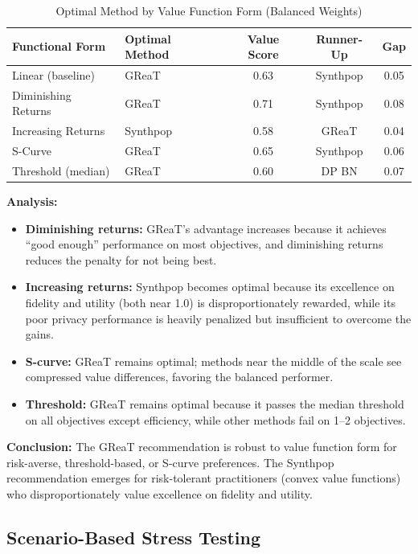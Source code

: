 \documentclass[12pt,a4paper]{article}
\begin{document}
\begin{table}[htbp]
\centering
\caption{Optimal Method by Value Function Form (Balanced Weights)}
\label{tab:value_function_sensitivity}
\begin{tabular}{@{}llccc@{}}
\toprule
\textbf{Functional Form} & \textbf{Optimal Method} & \textbf{Value Score} & \textbf{Runner-Up} & \textbf{Gap} \\
\midrule
Linear (baseline) & GReaT & 0.63 & Synthpop & 0.05 \\
Diminishing Returns & GReaT & 0.71 & Synthpop & 0.08 \\
Increasing Returns & Synthpop & 0.58 & GReaT & 0.04 \\
S-Curve & GReaT & 0.65 & Synthpop & 0.06 \\
Threshold (median) & GReaT & 0.60 & DP BN & 0.07 \\
\bottomrule
\end{tabular}
\end{table}

\textbf{Analysis:}
\begin{itemize}
    \item \textbf{Diminishing returns:} GReaT's advantage increases because it achieves ``good enough'' performance on most objectives, and diminishing returns reduces the penalty for not being best.
    \item \textbf{Increasing returns:} Synthpop becomes optimal because its excellence on fidelity and utility (both near 1.0) is disproportionately rewarded, while its poor privacy performance is heavily penalized but insufficient to overcome the gains.
    \item \textbf{S-curve:} GReaT remains optimal; methods near the middle of the scale see compressed value differences, favoring the balanced performer.
    \item \textbf{Threshold:} GReaT remains optimal because it passes the median threshold on all objectives except efficiency, while other methods fail on 1--2 objectives.
\end{itemize}

\textbf{Conclusion:} The GReaT recommendation is robust to value function form for risk-averse, threshold-based, or S-curve preferences. The Synthpop recommendation emerges for risk-tolerant practitioners (convex value functions) who disproportionately value excellence on fidelity and utility.

\subsection{Scenario-Based Stress Testing}
\end{document}
